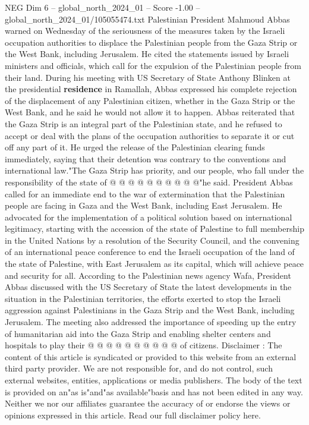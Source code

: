 \begin{textsample}{NEG Dim 6 – global\_north\_2024\_01 – Score -1.00 – global\_north\_2024\_01/105055474.txt}  \label{ex:f6_neg_357}
Palestinian President Mahmoud Abbas warned on Wednesday of the seriousness of the measures taken by the Israeli occupation authorities to displace the Palestinian people from the Gaza Strip or the West Bank, including Jerusalem.
He cited the statements issued by Israeli ministers and officials, which call for the expulsion of the Palestinian people from their land.
During his meeting with US Secretary of State Anthony Blinken at the presidential \textbf{residence} in Ramallah, Abbas expressed his complete rejection of the displacement of any Palestinian citizen, whether in the Gaza Strip or the West Bank, and he said he would not allow it to happen.
Abbas reiterated that the Gaza Strip is an integral part of the Palestinian state, and he refused to accept or deal with the plans of the occupation authorities to separate it or cut off any part of it.
He urged the release of the Palestinian clearing funds immediately, saying that their detention was contrary to the conventions and international law."The Gaza Strip has priority, and our people, who fall under the responsibility of the state of @ @ @ @ @ @ @ @ @ @"he said.
President Abbas called for an immediate end to the war of extermination that the Palestinian people are facing in Gaza and the West Bank, including East Jerusalem.
He advocated for the implementation of a political solution based on international legitimacy, starting with the accession of the state of Palestine to full membership in the United Nations by a resolution of the Security Council, and the convening of an international peace conference to end the Israeli occupation of the land of the state of Palestine, with East Jerusalem as its capital, which will achieve peace and security for all.
According to the Palestinian news agency Wafa, President Abbas discussed with the US Secretary of State the latest developments in the situation in the Palestinian territories, the efforts exerted to stop the Israeli aggression against Palestinians in the Gaza Strip and the West Bank, including Jerusalem.
The meeting also addressed the importance of speeding up the entry of humanitarian aid into the Gaza Strip and enabling shelter centers and hospitals to play their @ @ @ @ @ @ @ @ @ @ of citizens.
Disclaimer : The content of this article is syndicated or provided to this website from an external third party provider.
We are not responsible for, and do not control, such external websites, entities, applications or media publishers.
The body of the text is provided on an"as is"and"as available"basis and has not been edited in any way.
Neither we nor our affiliates guarantee the accuracy of or endorse the views or opinions expressed in this article.
Read our full disclaimer policy here.

\end{textsample}
